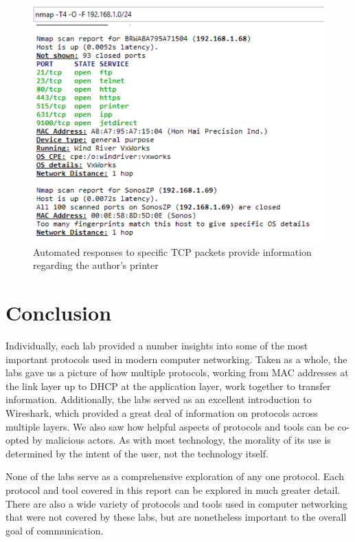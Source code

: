 \documentclass[10pt]{IEEEtran}
\begin{document}
    \begin{figure}[h!]
	\includegraphics[width=\linewidth]{nmapscan.png}
	\caption{Automated responses to specific TCP packets provide information regarding the author's printer}
	\label{fig:nmapscan}
\end{figure}
 
\section{Conclusion}

 Individually, each lab provided a number insights into some of the most important protocols used in modern computer networking. Taken as a whole, the labs gave us a picture of how multiple protocols, working from MAC addresses at the link layer up to DHCP at the application layer, work together to transfer information. Additionally, the labs served as an excellent introduction to Wireshark, which provided a great deal of information on protocols across multiple layers. We also saw how helpful aspects of protocols and tools can be co-opted by malicious actors. As with most technology, the morality of its use is determined by the intent of the user, not the technology itself.
 
 None of the labs serve as a comprehensive exploration of any one protocol. Each protocol and tool covered in this report can be explored in much greater detail. There are also a wide variety of protocols and tools used in computer networking that were not covered by these labs, but are nonetheless important to the overall goal of communication.\\
 
\end{document}
